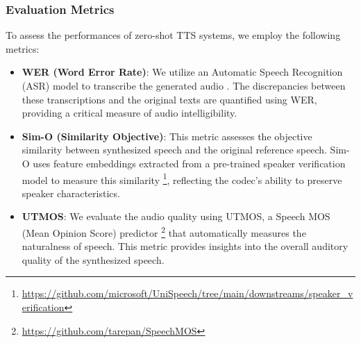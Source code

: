 \subsubsection{Evaluation Metrics}
To assess the performances of zero-shot TTS systems, we employ the following metrics:
\begin{itemize}
    \item \textbf{WER (Word Error Rate)}: We utilize an Automatic Speech Recognition (ASR) model to transcribe the generated audio \cite{wang2023neural}. The discrepancies between these transcriptions and the original texts are quantified using WER, providing a critical measure of audio intelligibility.
    
    \item \textbf{Sim-O (Similarity Objective)}: This metric assesses the objective similarity between synthesized speech and the original reference speech. Sim-O uses feature embeddings extracted from a pre-trained speaker verification model to measure this similarity \cite{hsu2021hubert,kim2024clam}\footnote{\url{https://github.com/microsoft/UniSpeech/tree/main/downstreams/speaker_verification}}, reflecting the codec's ability to preserve speaker characteristics.
    
    \item \textbf{UTMOS}: We evaluate the audio quality using UTMOS, a Speech MOS (Mean Opinion Score) predictor \cite{saeki2022utmos}\footnote{\url{https://github.com/tarepan/SpeechMOS}} that automatically measures the naturalness of speech. This metric provides insights into the overall auditory quality of the synthesized speech.
\end{itemize}


